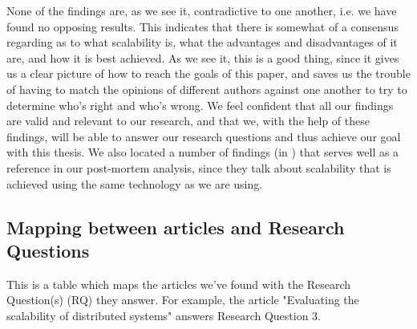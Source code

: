 \documentclass{article}
\begin{document}
None of the findings are, as we see it, contradictive to one another, i.e. we
have found no opposing results.  This indicates that there is somewhat of a
consensus regarding as to what scalability is, what the advantages and
disadvantages of it are, and how it is best achieved. As we see it, this is a
good thing, since it gives us a clear picture of how to reach the goals of this
paper, and saves us the trouble of having to match the opinions of different
authors against one another to try to determine who's right and who's wrong.
We feel confident that all our findings are valid and relevant to our research,
and that we, with the help of these findings, will be able to answer our
research questions and thus achieve our goal with this thesis.
We also located a number of findings
(in \cite{gropp1996high}\cite{miller2002pympi}\cite{millerparallel}) that
serves well as a reference in our post-mortem analysis, since they talk about
scalability that is achieved using the same technology as we are using.

\subsection{Mapping between articles and Research Questions}
This is a table which maps the articles we've found with the Research
Question(s) (RQ) they answer.  For example, the article "Evaluating the
scalability of distributed systems" answers Research Question 3.  
\end{document}
